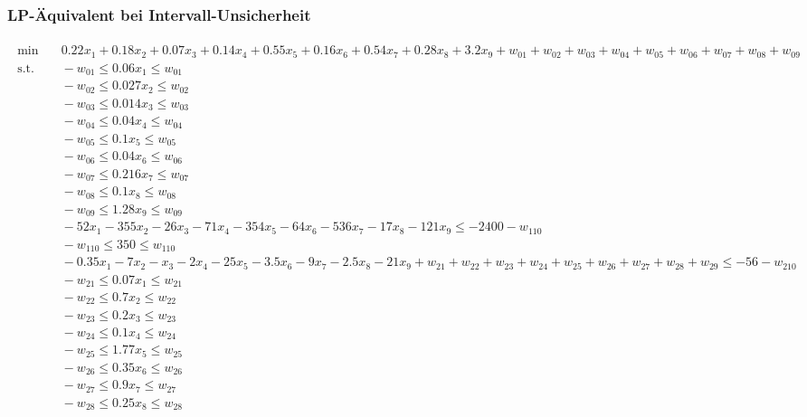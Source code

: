 \documentclass[a4paper,12pt]{article}
\begin{document}
\subsubsection*{LP-\"Aquivalent bei Intervall-Unsicherheit}
\label{sec:lp-equivalent}
\begin{adjustwidth}{-1.5cm}{}
\begin{tiny}
\setlength{\jot}{0pt}
\[
\begin{aligned}
   \begin{aligned}
    \min & \quad  0.22x_1 + 0.18x_2 + 0.07x_3 + 0.14x_4 + 0.55x_5 + 0.16x_6 + 0.54x_7 + 0.28x_8 + 3.2x_9 + w_{01} + w_{02} + w_{03} + w_{04} + w_{05} + w_{06} + w_{07}+ w_{08}+ w_{09} \\
    \text{s.t.} & \quad -w_{01} \leq 0.06x_1 \leq w_{01} \\
    & \quad -w_{02} \leq 0.027x_2 \leq w_{02} \\
    & \quad -w_{03} \leq 0.014x_3 \leq w_{03} \\
    & \quad -w_{04} \leq 0.04x_4 \leq w_{04} \\
    & \quad -w_{05} \leq 0.1x_5 \leq w_{05} \\
    & \quad -w_{06} \leq 0.04x_6 \leq w_{06} \\
    & \quad -w_{07} \leq 0.216x_7 \leq w_{07} \\
    & \quad -w_{08} \leq 0.1x_8 \leq w_{08} \\
    & \quad -w_{09} \leq 1.28x_9 \leq w_{09} \\
    & \quad -52x_1-355x_2-26x_3-71x_4-354x_5-64x_6-536x_7-17x_8-121x_9 \leq -2400 - w_{110}\\
    & \quad -w_{110} \leq 350 \leq w_{110} \\
    & \quad -0.35x_1 - 7x_2 - x_3 - 2x_4 - 25x_5 - 3.5x_6 - 9x_7 - 2.5x_8 - 21x_9 + w_{21} + w_{22} + w_{23} + w_{24} + w_{25} + w_{26} + w_{27}+ w_{28}+ w_{29} \leq -56 - w_{210} \\
    & \quad -w_{21} \leq 0.07x_1 \leq w_{21} \\
    & \quad -w_{22} \leq 0.7x_2 \leq w_{22} \\
    & \quad -w_{23} \leq 0.2x_3 \leq w_{23} \\
    & \quad -w_{24} \leq 0.1x_4 \leq w_{24} \\
    & \quad -w_{25} \leq 1.77x_5 \leq w_{25} \\
    & \quad -w_{26} \leq 0.35x_6 \leq w_{26} \\
    & \quad -w_{27} \leq 0.9x_7 \leq w_{27} \\
    & \quad -w_{28} \leq 0.25x_8 \leq w_{28} \\

\end{aligned}
\end{aligned}\]
\end{tiny}
\end{adjustwidth}
\end{document}
